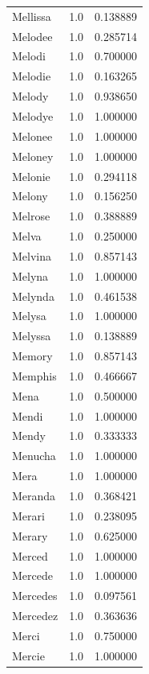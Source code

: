 \documentclass[
  letterpaper,
  DIV=11,
  numbers=noendperiod]{scrreprt}
\begin{document}
\begin{tabular}{lrr}
Mellissa        &   1.0 &   0.138889 \\
Melodee         &   1.0 &   0.285714 \\
Melodi          &   1.0 &   0.700000 \\
Melodie         &   1.0 &   0.163265 \\
Melody          &   1.0 &   0.938650 \\
Melodye         &   1.0 &   1.000000 \\
Melonee         &   1.0 &   1.000000 \\
Meloney         &   1.0 &   1.000000 \\
Melonie         &   1.0 &   0.294118 \\
Melony          &   1.0 &   0.156250 \\
Melrose         &   1.0 &   0.388889 \\
Melva           &   1.0 &   0.250000 \\
Melvina         &   1.0 &   0.857143 \\
Melyna          &   1.0 &   1.000000 \\
Melynda         &   1.0 &   0.461538 \\
Melysa          &   1.0 &   1.000000 \\
Melyssa         &   1.0 &   0.138889 \\
Memory          &   1.0 &   0.857143 \\
Memphis         &   1.0 &   0.466667 \\
Mena            &   1.0 &   0.500000 \\
Mendi           &   1.0 &   1.000000 \\
Mendy           &   1.0 &   0.333333 \\
Menucha         &   1.0 &   1.000000 \\
Mera            &   1.0 &   1.000000 \\
Meranda         &   1.0 &   0.368421 \\
Merari          &   1.0 &   0.238095 \\
Merary          &   1.0 &   0.625000 \\
Merced          &   1.0 &   1.000000 \\
Mercede         &   1.0 &   1.000000 \\
Mercedes        &   1.0 &   0.097561 \\
Mercedez        &   1.0 &   0.363636 \\
Merci           &   1.0 &   0.750000 \\
Mercie          &   1.0 &   1.000000 \\

\end{tabular}
\end{document}
